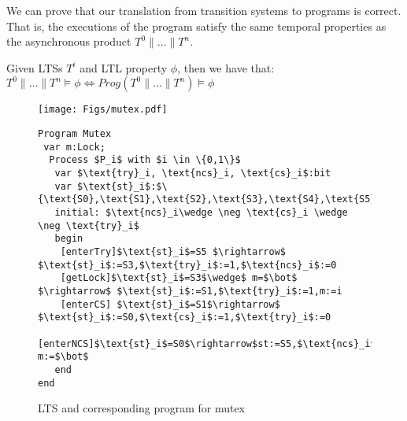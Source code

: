 We can prove that our translation from transition systems to programs is correct. That is, the executions of the program satisfy the same temporal properties as the 
asynchronous product $T^0 \parallel \dots \parallel T^{n}$.
\begin{theorem}\label{th:proppreservation} Given LTSs $T^i$ and \textsf{LTL} property $\phi$, then we have that:
$
	T^0 \parallel \dots \parallel T^{n} \vDash \phi \Leftrightarrow Prog(T^0 \parallel \dots \parallel T^{n}) \vDash \phi
$
\end{theorem}
\begin{figure}[t!]
\begin{minipage}[b]{0.30\linewidth}
\centering
\texttt{[image: Figs/mutex.pdf]}\label{fig:mutex-lts}
\end{minipage}
\hspace{0.7cm}
\begin{minipage}[b]{0.70\linewidth}
\centering
\begin{lstlisting}[style=Unity]
Program Mutex
 var m:Lock;
  Process $P_i$ with $i \in \{0,1\}$
   var $\text{try}_i, \text{ncs}_i, \text{cs}_i$:bit
   var $\text{st}_i$:$\{\text{S0},\text{S1},\text{S2},\text{S3},\text{S4},\text{S5}\}$
   initial: $\text{ncs}_i\wedge \neg \text{cs}_i \wedge \neg \text{try}_i$ 
   begin
    [enterTry]$\text{st}_i$=S5 $\rightarrow$ $\text{st}_i$:=S3,$\text{try}_i$:=1,$\text{ncs}_i$:=0
    [getLock]$\text{st}_i$=S3$\wedge$ m=$\bot$ $\rightarrow$ $\text{st}_i$:=S1,$\text{try}_i$:=1,m:=i
    [enterCS] $\text{st}_i$=S1$\rightarrow$ $\text{st}_i$:=S0,$\text{cs}_i$:=1,$\text{try}_i$:=0
    [enterNCS]$\text{st}_i$=S0$\rightarrow$st:=S5,$\text{ncs}_i$:=1,$\text{cs}_i$:=0 m:=$\bot$
   end
end
\end{lstlisting}
\end{minipage}
\caption{LTS and corresponding program for mutex}\label{fig:mutex}
\end{figure}
